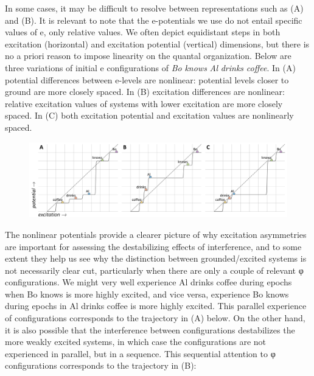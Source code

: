   In some cases, it may be difficult to resolve between representations such as (A) and (B). It is relevant to note that the e-potentials we use do not entail specific values of e, only relative values. We often depict equidistant steps in both excitation (horizontal) and excitation potential (vertical) dimensions, but there is no a priori reason to impose linearity on the quantal organization. Below are three variations of initial e configurations of \textit{Bo} \textit{knows} \textit{Al} \textit{drinks} \textit{coffee}. In (A) potential differences between e-levels are nonlinear: potential levels closer to ground are more closely spaced. In (B) excitation differences are nonlinear: relative excitation values of systems with lower excitation are more closely spaced. In (C) both excitation potential and excitation values are nonlinearly spaced.

  
\begin{figure}
\includegraphics[width=\textwidth]{figures/Tilsen-img96.png}
\caption{\missingcaption}
\label{fig:}
\end{figure}
   

  The nonlinear potentials provide a clearer picture of why excitation asymmetries are important for assessing the destabilizing effects of interference, and to some extent they help us see why the distinction between grounded/excited systems is not necessarily clear cut, particularly when there are only a couple of relevant φ configurations. We might very well experience {\textbar}Al drinks coffee{\textbar} during epochs when {\textbar}Bo knows{\textbar} is more highly excited, and vice versa, experience {\textbar}Bo knows{\textbar} during epochs in {\textbar}Al drinks coffee{\textbar} is more highly excited. This parallel experience of configurations corresponds to the trajectory in (A) below. On the other hand, it is also possible that the interference between configurations destabilizes the more weakly excited systems, in which case the configurations are not experienced in parallel, but in a sequence. This sequential attention to φ configurations corresponds to the trajectory in (B):

